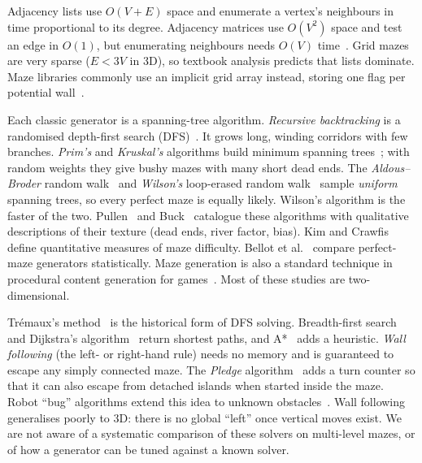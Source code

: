 Adjacency lists use $O(V+E)$ space and enumerate a vertex's neighbours in time proportional to its degree.
Adjacency matrices use $O(V^2)$ space and test an edge in $O(1)$, but enumerating neighbours needs $O(V)$ time~\cite{cormen2009introduction}.
Grid mazes are very sparse ($E < 3V$ in 3D), so textbook analysis predicts that lists dominate.
Maze libraries commonly use an implicit grid array instead, storing one flag per potential wall~\cite{buck2015mazes}.

Each classic generator is a spanning-tree algorithm.
\emph{Recursive backtracking} is a randomised depth-first search (DFS)~\cite{tarjan1972depth}.
It grows long, winding corridors with few branches.
\emph{Prim's} and \emph{Kruskal's} algorithms build minimum spanning trees~\cite{prim1957shortest,kruskal1956shortest}; with random weights they give bushy mazes with many short dead ends.
The \emph{Aldous--Broder} random walk~\cite{aldous1990random,broder1989generating} and \emph{Wilson's} loop-erased random walk~\cite{wilson1996generating} sample \emph{uniform} spanning trees, so every perfect maze is equally likely.
Wilson's algorithm is the faster of the two.
Pullen~\cite{pullen2023think} and Buck~\cite{buck2015mazes} catalogue these algorithms with qualitative descriptions of their texture (dead ends, river factor, bias).
Kim and Crawfis~\cite{kim2015quest} define quantitative measures of maze difficulty.
Bellot et al.~\cite{bellot2021generate} compare perfect-maze generators statistically.
Maze generation is also a standard technique in procedural content generation for games~\cite{shaker2016procedural}.
Most of these studies are two-dimensional.

Trémaux's method~\cite{lucas1882recreations} is the historical form of DFS solving.
Breadth-first search~\cite{moore1959shortest} and Dijkstra's algorithm~\cite{dijkstra1959note} return shortest paths, and A*~\cite{hart1968formal} adds a heuristic.
\emph{Wall following} (the left- or right-hand rule) needs no memory and is guaranteed to escape any simply connected maze.
The \emph{Pledge} algorithm~\cite{abelson1980turtle} adds a turn counter so that it can also escape from detached islands when started inside the maze.
Robot ``bug'' algorithms extend this idea to unknown obstacles~\cite{lumelsky1987path}.
Wall following generalises poorly to 3D: there is no global ``left'' once vertical moves exist.
We are not aware of a systematic comparison of these solvers on multi-level mazes, or of how a generator can be tuned against a known solver.

